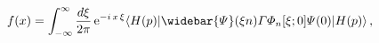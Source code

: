 \begin{equation}
\label{CollinearPDFs}
f (x)
=
\int_{-\infty}^\infty \frac{d \xi}{2 \pi} \,
{\rm e}^{- i \, x \, \xi}
\langle H(p) |
\widebar {\mit\Psi} (\xi n) {\mit\Gamma} {\mit\Phi}_n [ \xi ; 0 ] {\mit\Psi} (0)
| H(p) \rangle
\, ,
\end{equation}

